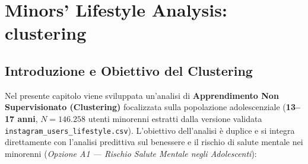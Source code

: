 \chapter{Minors' Lifestyle Analysis: clustering}
\label{cap:clustering}

\section{Introduzione e Obiettivo del Clustering}
\label{sec:intro_clustering}

Nel presente capitolo viene sviluppata un'analisi di \textbf{Apprendimento Non Supervisionato (Clustering)} focalizzata sulla popolazione adolescenziale (\textbf{13--17 anni}, $N = 146.258$ utenti minorenni estratti dalla versione validata \texttt{instagram\_users\_lifestyle.csv}). L'obiettivo dell'analisi è duplice e si integra direttamente con l'analisi predittiva sul benessere e il rischio di salute mentale nei minorenni (\emph{Opzione A1 --- Rischio Salute Mentale negli Adolescenti}):

